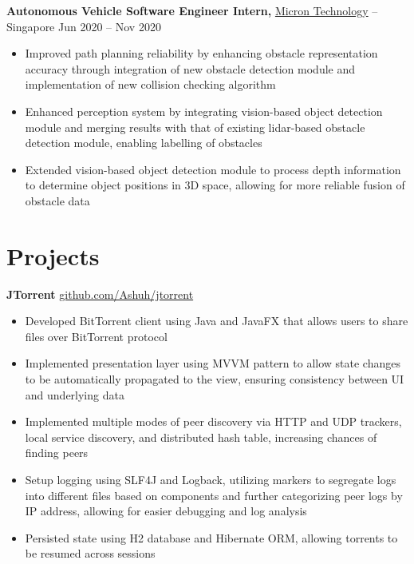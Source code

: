 \documentclass[11pt]{article}       %
\begin{document}
\textbf{Autonomous Vehicle Software Engineer Intern,} \href{https://www.micron.com/}{Micron Technology} -- Singapore \hfill Jun 2020 -- Nov 2020 \\
\vspace{-9pt}
\begin{itemize}
  \item Improved path planning reliability by enhancing obstacle representation accuracy through integration of new obstacle detection module and implementation of new collision checking algorithm
  \item Enhanced perception system by integrating vision-based object detection module and merging results with that of existing lidar-based obstacle detection module, enabling labelling of obstacles
  \item Extended vision-based object detection module to process depth information to determine object positions in 3D space, allowing for more reliable fusion of obstacle data
\end{itemize}

\vspace{-18.5pt}

\section*{Projects}
\textbf{JTorrent} \hfill \href{https://github.com/Ashuh/jtorrent}{github.com/Ashuh/jtorrent} \\
\vspace{-9pt}
\begin{itemize}
  \item Developed BitTorrent client using Java and JavaFX that allows users to share files over BitTorrent protocol
  \item Implemented presentation layer using MVVM pattern to allow state changes to be automatically propagated to the view, ensuring consistency between UI and underlying data
  \item Implemented multiple modes of peer discovery via HTTP and UDP trackers, local service discovery, and distributed hash table, increasing chances of finding peers
  \item Setup logging using SLF4J and Logback, utilizing markers to segregate logs into different files based on components and further categorizing peer logs by IP address, allowing for easier debugging and log analysis
  \item Persisted state using H2 database and Hibernate ORM, allowing torrents to be resumed across sessions
\end{itemize}
\end{document}
